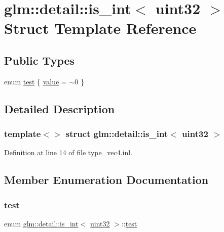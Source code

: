 \hypertarget{structglm_1_1detail_1_1is__int_3_01uint32_01_4}{}\section{glm\+::detail\+::is\+\_\+int$<$ uint32 $>$ Struct Template Reference}
\label{structglm_1_1detail_1_1is__int_3_01uint32_01_4}
\subsection*{Public Types}
\begin{DoxyCompactItemize}
\item 
enum \mbox{\hyperlink{structglm_1_1detail_1_1is__int_3_01uint32_01_4_a8930e3fe143b2eb718be340178475095}{test}} \{ \mbox{\hyperlink{structglm_1_1detail_1_1is__int_3_01uint32_01_4_a8930e3fe143b2eb718be340178475095a33d5c966994a88b96988fb1085e9530c}{value}} = $\sim$0
 \}
\end{DoxyCompactItemize}


\subsection{Detailed Description}
\subsubsection*{template$<$$>$\newline
struct glm\+::detail\+::is\+\_\+int$<$ uint32 $>$}



Definition at line 14 of file type\+\_\+vec4.\+inl.



\subsection{Member Enumeration Documentation}
\mbox{\label{structglm_1_1detail_1_1is__int_3_01uint32_01_4_a8930e3fe143b2eb718be340178475095}} 
\subsubsection{\texorpdfstring{test}{test}}
{\footnotesize\ttfamily enum \mbox{\hyperlink{structglm_1_1detail_1_1is__int}{glm\+::detail\+::is\+\_\+int}}$<$ \mbox{\hyperlink{namespaceglm_1_1detail_ade6cfbf377022aaa391af8cd50489222}{uint32}} $>$\+::\mbox{\hyperlink{structglm_1_1detail_1_1is__int_3_01uint32_01_4_a8930e3fe143b2eb718be340178475095}{test}}}

